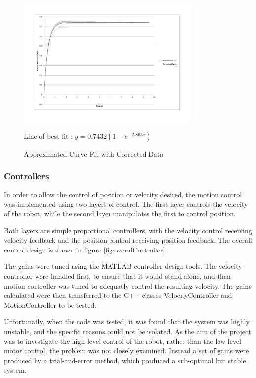 \documentclass[10pt]{article} \usepackage[a4paper]{geometry}
\begin{document}
\begin{figure}
 \centering
 \includegraphics[width=0.8\textwidth]{Images/approximate-fit-model-time-shift}
 \caption{Approximated Curve Fit with Corrected Data}
 \label{fig:approximateFitTimeShiftRemoved}

 Line of best fit : $y=0.7432 \left(1-e^{-2.863x}\right)$
\end{figure}

\subsubsection{Controllers}

In order to allow the control of position or velocity desired, the motion
control was implemented using two layers of control.  The first layer controls
the velocity of the robot, while the second layer manipulates the first to
control position.

Both layers are simple proportional controllers, with the velocity control
receiving velocity feedback and the position control receiving position
feedback.  The overall control design is shown in figure
\ref{fig:overalController}.

The gains were tuned using the MATLAB controller design tools.  The velocity
controller were handled first, to ensure that it would stand alone, and then
motion controller was tuned to adequatly control the resulting velocity.  The
gains calculated were then transferred to the C++ classes VelocityController and
MotionController to be tested.

Unfortunatly, when the code was tested, it was found that the system was highly
unstable, and the specific reasons could not be isolated.  As the aim of the
project was to investigate the high-level control of the robot, rather than the
low-level motor control, the problem was not closely examined.  Instead a set of
gains were produced by a trial-and-error method, which produced a sub-optimal
but stable system.
\end{document}
